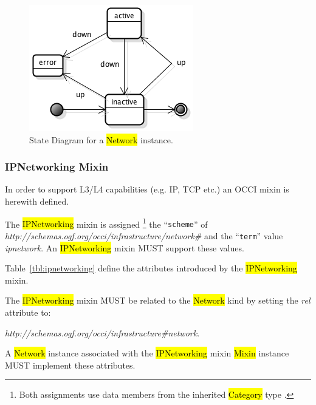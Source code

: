 \documentclass[10pt,a4paper]{article}
\begin{document}
\begin{figure}[!h]
	\centering
	\includegraphics[scale=0.4]{figs/network-state.png}
	\caption{State Diagram for a \hl{Network} instance.}
	\label{fig:network_state}
\end{figure}

\subsubsection{IPNetworking Mixin}

In order to support L3/L4 capabilities (e.g. IP, TCP etc.) an OCCI
mixin is herewith defined.

The \hl{IPNetworking} mixin is assigned%
\footnote{Both assignments use data members from the inherited
  \hl{Category} type \cite{occi:core}.}  the ``{\tt scheme}'' of
\textit{http://schemas.ogf.org/occi/infrastructure/network\#} and the
``{\tt term}'' value \textit{ipnetwork}. An \hl{IPNetworking} mixin
MUST support these values.

Table~\ref{tbl:ipnetworking} define the attributes introduced by the
\hl{IPNetworking} mixin.  

The \hl{IPNetworking} mixin MUST be related to the \hl{Network} kind 
by setting the \textit{rel} attribute to:

\textit{http://schemas.ogf.org/occi/infrastructure\#network}.

A \hl{Network} instance associated with the
\hl{IPNetworking} mixin \hl{Mixin} instance MUST implement these
attributes.

\end{document}
